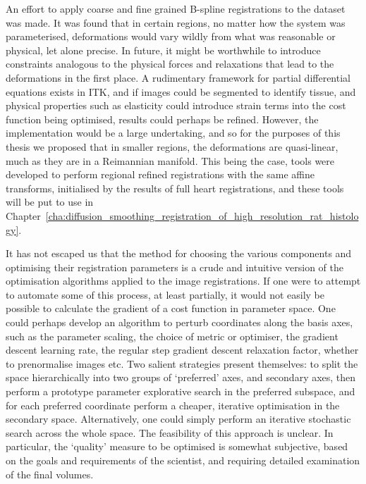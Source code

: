 	An effort to apply coarse and fine grained B-spline registrations to the dataset was made. It was found that in certain regions, no matter how the system was parameterised, deformations would vary wildly from what was reasonable or physical, let alone precise. In future, it might be worthwhile to introduce constraints analogous to the physical forces and relaxations that lead to the deformations in the first place. A rudimentary framework for partial differential equations exists in ITK, and if images could be segmented to identify tissue, and physical properties such as elasticity could introduce strain terms into the cost function being optimised, results could perhaps be refined. However, the implementation would be a large undertaking, and so for the purposes of this thesis we proposed that in smaller regions, the deformations are quasi-linear, much as they are in a Reimannian manifold. This being the case, tools were developed to perform regional refined registrations with the same affine transforms, initialised by the results of full heart registrations, and these tools will be put to use in Chapter~\ref{cha:diffusion_smoothing_registration_of_high_resolution_rat_histology}.
    
  It has not escaped us that the method for choosing the various components and optimising their registration parameters is a crude and intuitive version of the optimisation algorithms applied to the image registrations. If one were to attempt to automate some of this process, at least partially, it would not easily be possible to calculate the gradient of a cost function in parameter space. One could perhaps develop an algorithm to perturb coordinates along the basis axes, such as the parameter scaling, the choice of metric or optimiser, the gradient descent learning rate, the regular step gradient descent relaxation factor, whether to prenormalise images etc. Two salient strategies present themselves: to split the space hierarchically into two groups of `preferred' axes, and secondary axes, then perform a prototype parameter explorative search in the preferred subspace, and for each preferred coordinate perform a cheaper, iterative optimisation in the secondary space. Alternatively, one could simply perform an iterative stochastic search across the whole space. The feasibility of this approach is unclear. In particular, the `quality' measure to be optimised is somewhat subjective, based on the goals and requirements of the scientist, and requiring detailed examination of the final volumes.
  
